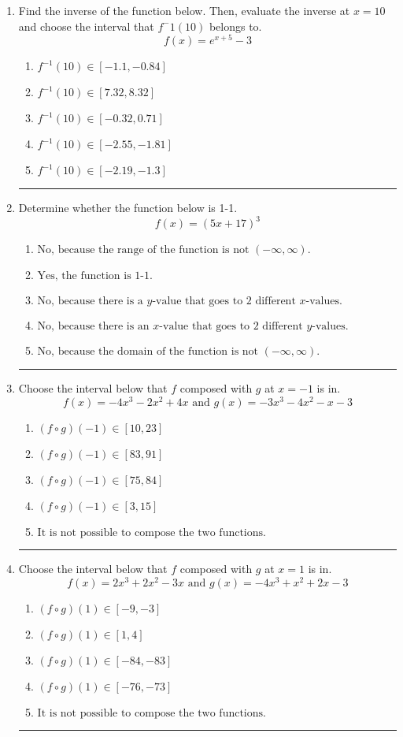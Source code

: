 \documentclass[14pt]{extbook}
\newcommand{\litem}[1]{\item#1\hspace*{-1cm}\rule{\textwidth}{0.4pt}}
\begin{document}
\begin{enumerate}
{\begin{enumerate}[label=\Alph*.]
\end{enumerate} }
\litem{
Find the inverse of the function below. Then, evaluate the inverse at $x = 10$ and choose the interval that $f^-1(10)$ belongs to.\[ f(x) = e^{x+5}-3 \]\begin{enumerate}[label=\Alph*.]
\item \( f^{-1}(10) \in [-1.1, -0.84] \)
\item \( f^{-1}(10) \in [7.32, 8.32] \)
\item \( f^{-1}(10) \in [-0.32, 0.71] \)
\item \( f^{-1}(10) \in [-2.55, -1.81] \)
\item \( f^{-1}(10) \in [-2.19, -1.3] \)

\end{enumerate} }
\litem{
Determine whether the function below is 1-1.\[ f(x) = (5 x + 17)^3 \]\begin{enumerate}[label=\Alph*.]
\item \( \text{No, because the range of the function is not $(-\infty, \infty)$.} \)
\item \( \text{Yes, the function is 1-1.} \)
\item \( \text{No, because there is a $y$-value that goes to 2 different $x$-values.} \)
\item \( \text{No, because there is an $x$-value that goes to 2 different $y$-values.} \)
\item \( \text{No, because the domain of the function is not $(-\infty, \infty)$.} \)

\end{enumerate} }
\litem{
Choose the interval below that $f$ composed with $g$ at $x=-1$ is in.\[ f(x) = -4x^{3} -2 x^{2} +4 x \text{ and } g(x) = -3x^{3} -4 x^{2} -x -3 \]\begin{enumerate}[label=\Alph*.]
\item \( (f \circ g)(-1) \in [10, 23] \)
\item \( (f \circ g)(-1) \in [83, 91] \)
\item \( (f \circ g)(-1) \in [75, 84] \)
\item \( (f \circ g)(-1) \in [3, 15] \)
\item \( \text{It is not possible to compose the two functions.} \)

\end{enumerate} }
\litem{
Choose the interval below that $f$ composed with $g$ at $x=1$ is in.\[ f(x) = 2x^{3} +2 x^{2} -3 x \text{ and } g(x) = -4x^{3} + x^{2} +2 x -3 \]\begin{enumerate}[label=\Alph*.]
\item \( (f \circ g)(1) \in [-9, -3] \)
\item \( (f \circ g)(1) \in [1, 4] \)
\item \( (f \circ g)(1) \in [-84, -83] \)
\item \( (f \circ g)(1) \in [-76, -73] \)
\item \( \text{It is not possible to compose the two functions.} \)


\end{enumerate}}
\end{enumerate}
\end{document}

